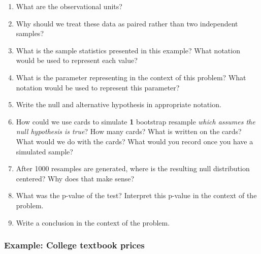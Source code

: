 \documentclass[
]{report}
\newcommand{\rgs}{\vspace{12pt}} %
\begin{document}
\begin{enumerate}
\def\labelenumi{\arabic{enumi}.}
\item
  What are the observational units?
  \rgs
\item
  Why should we treat these data as paired rather than two independent samples?
  \rgs
\item
  What is the sample statistics presented in this example? What notation would be used to represent each value?
  \rgs
\item
  What is the parameter representing in the context of this problem? What notation would be used to represent this parameter?
  \rgs
  \rgs
\item
  Write the null and alternative hypothesis in appropriate notation.
  \rgs
\item
  How could we use cards to simulate \textbf{1} bootstrap resample \emph{which assumes the null hypothesis is true}? How many cards? What is written on the cards? What would we do with the cards? What would you record once you have a simulated sample?
  \rgs
  \rgs
\item
  After 1000 resamples are generated, where is the resulting null distribution centered? Why does that make sense?
  \rgs
\item
  What was the p-value of the test? Interpret this p-value in the context of the problem.
  \rgs
  \rgs
\item
  Write a conclusion in the context of the problem.
  \rgs
\end{enumerate}

\hypertarget{example-college-textbook-prices}{%
\subsubsection*{Example: College textbook prices}\label{example-college-textbook-prices}}
\end{document}

